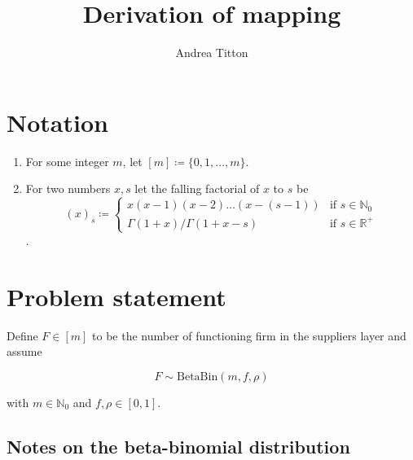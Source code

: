 \documentclass[american, abstract=on]{scrartcl}
\author{Andrea Titton}
\title{Derivation of mapping}
\renewcommand{\Re}{\mathbb{R}}
\newcommand{\Beta}{\text{Beta}}
\newcommand{\Bin}{\text{Bin}}
\begin{document}
\maketitle

\section{Notation}

\begin{enumerate}
    \item For some integer $m$, let $[m] \coloneqq \{0, 1, \ldots, m\}$.
    \item For two numbers $x, s$ let the falling factorial of $x$ to $s$ be \begin{equation}
        (x)_s \coloneqq \begin{cases} x(x - 1)(x - 2)\ldots(x - (s - 1)) & \text{if } s \in \mathbb{N}_0 \\
       \Gamma(1 + x) \Big/ \Gamma(1 + x - s)& \text{if } s \in \Re^{+}
        \end{cases}
    \end{equation}.
\end{enumerate}

\section{Problem statement}

Define $F \in [m]$ to be the number of functioning firm in the suppliers layer and assume 

\begin{equation}
    F \sim \Beta\Bin(m, f, \rho)
\end{equation}

with $m \in \mathbb{N}_0$ and $f, \rho \in [0, 1]$.

\subsection{Notes on the beta-binomial distribution}
\end{document}
